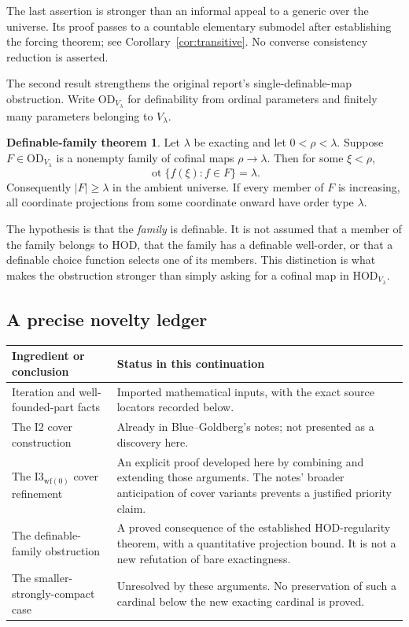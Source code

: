\documentclass[11pt,letterpaper]{article}
\theoremstyle{definition}
\newcommand{\HOD}{\mathrm{HOD}}
\newcommand{\OD}{\mathrm{OD}}
\newcommand{\ot}{\operatorname{ot}}
\newcommand{\Itwo}{\mathrm{I2}}
\newcommand{\Iwf}{\mathrm{I3}_{\mathrm{wf}(0)}}
\newtheorem*{widththeorem}{Definable-family theorem}
\begin{document}
The last assertion is stronger than an informal appeal to a generic over
the universe. Its proof passes to a countable elementary submodel after
establishing the forcing theorem; see Corollary~\ref{cor:transitive}.
No converse consistency reduction is asserted.

The second result strengthens the original report's single-definable-map
obstruction. Write $\OD_{V_\lambda}$ for definability from ordinal parameters
and finitely many parameters belonging to $V_\lambda$.

\begin{widththeorem}
Let $\lambda$ be exacting and let $0<\rho<\lambda$. Suppose
$F\in\OD_{V_\lambda}$ is a nonempty family of cofinal maps
$\rho\to\lambda$. Then for some $\xi<\rho$,
\[
 \ot\{f(\xi):f\in F\}=\lambda.
\]
Consequently $|F|\geq\lambda$ in the ambient universe. If every member
of $F$ is increasing, all coordinate projections from some coordinate
onward have order type $\lambda$.
\end{widththeorem}

The hypothesis is that the \emph{family} is definable. It is not assumed
that a member of the family belongs to HOD, that the family has a definable
well-order, or that a definable choice function selects one of its members.
This distinction is what makes the obstruction stronger than simply
asking for a cofinal map in $\HOD_{V_\lambda}$.

\subsection{A precise novelty ledger}

\begin{center}
\small
\renewcommand{\arraystretch}{1.18}
\begin{tabularx}{\textwidth}{@{}P{.29\textwidth}Y@{}}
\toprule
\textbf{Ingredient or conclusion}&\textbf{Status in this continuation}\\\midrule
Iteration and well-founded-part facts&Imported mathematical inputs, with the exact source locators recorded below.\\
The $\Itwo$ cover construction&Already in Blue--Goldberg's notes; not presented as a discovery here.\\
The $\Iwf$ cover refinement&An explicit proof developed here by combining and extending those arguments. The notes' broader anticipation of cover variants prevents a justified priority claim.\\
The definable-family obstruction&A proved consequence of the established HOD-regularity theorem, with a quantitative projection bound. It is not a new refutation of bare exactingness.\\
The smaller-strongly-compact case&Unresolved by these arguments. No preservation of such a cardinal below the new exacting cardinal is proved.\\
\bottomrule
\end{tabularx}
\end{center}
\end{document}

